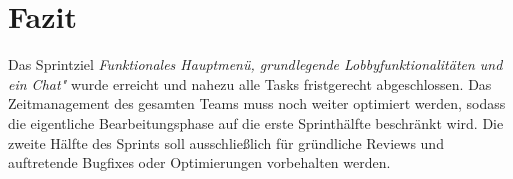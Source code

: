 \documentclass[12pt,a4paper, oneside]{article}
\begin{document}
    \section{Fazit}
    Das Sprintziel \textit{\glqq Funktionales Hauptmenü, grundlegende Lobbyfunktionalitäten und ein Chat"} wurde erreicht und nahezu alle Tasks fristgerecht abgeschlossen. Das Zeitmanagement des gesamten Teams muss noch weiter optimiert werden, sodass die eigentliche Bearbeitungsphase auf die erste Sprinthälfte beschränkt wird. Die zweite Hälfte des Sprints soll ausschließlich für gründliche Reviews und auftretende Bugfixes oder Optimierungen vorbehalten werden.
\end{document}
